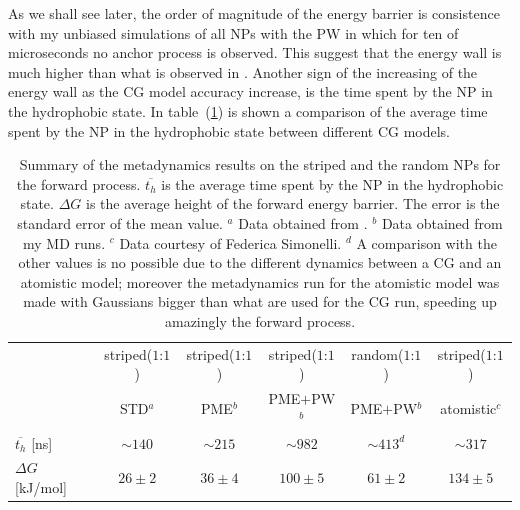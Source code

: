 As we shall see later, the order of magnitude of the energy barrier is consistence with my unbiased simulations of 
all \acp{NP} with the \ac{PW} in which for ten of microseconds no anchor process is observed. This suggest that 
the energy wall is much higher than what is observed in \cite{ourPaper}. Another sign of the increasing of the 
energy wall as the \ac{CG} model accuracy increase, is the time spent by the \ac{NP} in the hydrophobic state. In 
table~(\ref{tab:hydroTime}) is shown a comparison of the average time spent by the \ac{NP} in the hydrophobic 
state between different \ac{CG} models.
\begin{table}[h!t]
	\centering\footnotesize
	\begin{tabular}{lccccc}
		\toprule
		\,	& striped($1$:$1$)	& striped($1$:$1$)	& striped($1$:$1$)	& random($1$:$1$)	& striped($1$:$1$) 	\\
		\,	& STD$^a$	& \acs{PME}$^b$	& \acs{PME}$+$\acs{PW}$^b$	& \acs{PME}$+$\acs{PW}$^b$ 	& atomistic$^c$		\\ \toprule
	$\overline{t_{h}}$ [ns]	& $\sim 140$& $\sim 215$	& $\sim 982$	& $\sim 413^d$ 	& $\sim 317$		\\ \midrule
	$\Delta G$ [kJ/mol] 	& $26 \pm 2$& $36 \pm 4$	& $100 \pm 5$	& $61 \pm 2$ 	& $134 \pm 5$		\\ \bottomrule
	\end{tabular}
	\caption{Summary of the metadynamics results on the striped and the random \acp{NP} for the forward process. $\overline{t_h}$ is the average time spent by the \acs{NP} in the hydrophobic state. $\Delta G$ is the average height of the forward energy barrier. The error is the standard error of the mean value. $^a$ Data obtained from \cite{ourPaper}. $^b$ Data obtained from my \acs{MD} runs. $^c$ Data courtesy of Federica Simonelli. $^d$ A comparison with the other values is no possible due to the different dynamics between a \ac{CG} and an atomistic model; moreover the metadynamics run for the atomistic model was made with Gaussians bigger than what are used for the \ac{CG} run, speeding up amazingly the forward process.}%
	\label{tab:hydroTime}
\end{table}

